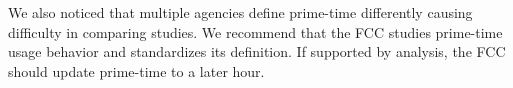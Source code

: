 We also noticed that multiple agencies define prime-time differently causing difficulty in comparing studies. We recommend that the FCC studies prime-time usage behavior and standardizes its definition. If supported by analysis, the FCC should update prime-time to a later hour.%
